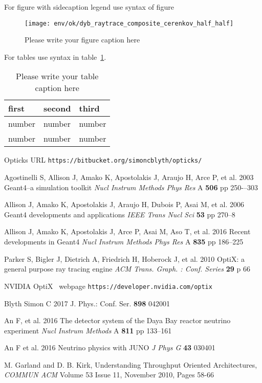 \documentclass{webofc}
\begin{document}
For figure with sidecaption legend use syntax of figure
\begin{figure}
\centering
\sidecaption
\texttt{[image: env/ok/dyb\_raytrace\_composite\_cerenkov\_half\_half]}
\caption{Please write your figure caption here}
\label{fig-3}       %
\end{figure}

For tables use syntax in table~\ref{tab-1}.
\begin{table}
\centering
\caption{Please write your table caption here}
\label{tab-1}       %
\begin{tabular}{lll}
\hline
first & second & third  \\\hline
number & number & number \\
number & number & number \\\hline
\end{tabular}
\vspace*{5cm}  %
\end{table}
%
%
%
%
%
\begin{thebibliography}{}


Opticks URL {\tt https://bitbucket.org/simoncblyth/opticks/}

Agostinelli S, Allison J, Amako K, Apostolakis J, Araujo H, Arce P, et al.
2003
Geant4--a simulation toolkit
{\it Nucl Instrum Methods Phys Res} A {\bf 506} pp 250-–303

Allison J, Amako K, Apostolakis J, Araujo H, Dubois P, Asai M, et al.
2006
Geant4 developments and applications
{\it IEEE Trans Nucl Sci} {\bf 53} pp 270--8

Allison J, Amako K, Apostolakis J, Arce P, Asai M, Aso T, et al.
2016
Recent developments in Geant4
{\it Nucl Instrum Methods Phys Res} A {\bf 835} pp 186--225

Parker S, Bigler J, Dietrich A, Friedrich H, Hoberock J, et al.
2010
OptiX: a general purpose ray tracing engine
{\it ACM Trans. Graph. : Conf. Series} {\bf 29} p 66

NVIDIA{\textregistered} OptiX\texttrademark~ webpage {\tt https://developer.nvidia.com/optix}

Blyth Simon C 2017 J. Phys.: Conf. Ser. {\bf 898} 042001

An F, et al.
2016
The detector system of the Daya Bay reactor neutrino experiment
{\it Nucl Instrum Methods} A {\bf 811} pp 133--161

An F et al.
2016
Neutrino physics with JUNO
{\it J Phys G} {\bf 43} 030401


M. Garland and D. B. Kirk, Understanding Throughput Oriented Architectures, 
{\it COMMUN ACM} Volume 53 Issue 11, November 2010, Pages 58-66  	





\end{thebibliography}
\end{document}
